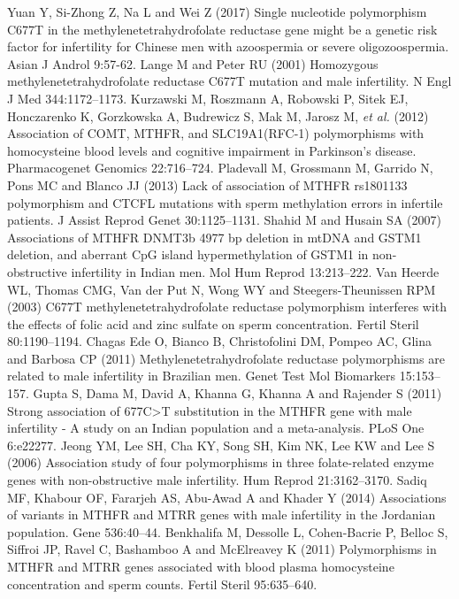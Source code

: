 \pagebreak\onecolumn
\begin{biblio}[References]
 Yuan Y, Si-Zhong Z, Na L and Wei Z (2017) Single nucleotide polymorphism C677T in the methylenetetrahydrofolate reductase gene might be a genetic risk factor for infertility for Chinese men with azoospermia or severe oligozoospermia. Asian J Androl 9:57-62.
 Lange M and Peter RU (2001) Homozygous methylenetetrahydrofolate reductase C677T mutation and male infertility. N Engl J Med 344:1172–1173.
 Kurzawski M, Roszmann A, Robowski P, Sitek EJ, Honczarenko K, Gorzkowska A, Budrewicz S, Mak M, Jarosz M, \textit{et al.} (2012) Association of COMT, MTHFR, and SLC19A1(RFC-1) polymorphisms with homocysteine blood levels and cognitive impairment in Parkinson’s disease. Pharmacogenet Genomics 22:716–724.
 Pladevall M, Grossmann M, Garrido N, Pons MC and Blanco JJ (2013) Lack of association of MTHFR rs1801133 polymorphism and CTCFL mutations with sperm methylation errors in infertile patients. J Assist Reprod Genet 30:1125–1131.
 Shahid M and Husain SA (2007) Associations of MTHFR DNMT3b 4977 bp deletion in mtDNA and GSTM1 deletion, and aberrant CpG island hypermethylation of GSTM1 in non-obstructive infertility in Indian men. Mol Hum Reprod 13:213–222.
 Van Heerde WL, Thomas CMG, Van der Put N, Wong WY and Steegers-Theunissen RPM (2003) C677T methylenetetrahydrofolate reductase polymorphism interferes with the effects of folic acid and zinc sulfate on sperm concentration. Fertil Steril 80:1190–1194.
 Chagas Ede O, Bianco B, Christofolini DM, Pompeo AC, Glina and Barbosa CP (2011) Methylenetetrahydrofolate reductase polymorphisms are related to male infertility in Brazilian men. Genet Test Mol Biomarkers 15:153–157.
 Gupta S, Dama M, David A, Khanna G, Khanna A and Rajender S (2011) Strong association of 677C>T substitution in the MTHFR gene with male infertility - A study on an Indian population and a meta-analysis. PLoS One 6:e22277.
 Jeong YM, Lee SH, Cha KY, Song SH, Kim NK, Lee KW and Lee S (2006) Association study of four polymorphisms in three folate-related enzyme genes with non-obstructive male infertility. Hum Reprod 21:3162–3170.
 Sadiq MF, Khabour OF, Fararjeh AS, Abu-Awad A and Khader Y (2014) Associations of variants in MTHFR and MTRR genes with male infertility in the Jordanian population. Gene 536:40–44.
 Benkhalifa M, Dessolle L, Cohen-Bacrie P, Belloc S, Siffroi JP, Ravel C, Bashamboo A and McElreavey K (2011) Polymorphisms in MTHFR and MTRR genes associated with blood plasma homocysteine concentration and sperm counts. Fertil Steril 95:635–640.

\end{biblio}
